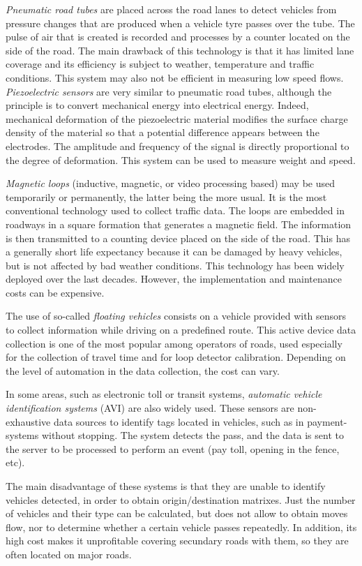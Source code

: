 \documentclass{llncs}
\begin{document}
\emph{Pneumatic road tubes} are placed across the road lanes to detect vehicles from pressure changes that are produced when a vehicle tyre passes over the tube. The pulse of air that is created is recorded and processes by a counter located on the side of the road. The main drawback of this technology is that it has limited lane coverage and its efficiency is subject to weather, temperature and traffic conditions. This system may also not be efficient in measuring low speed flows.
\emph{Piezoelectric sensors} are very similar to pneumatic road tubes, although the principle is to convert mechanical energy into electrical energy. Indeed, mechanical deformation of the piezoelectric material modifies the surface charge density of the material so that a potential difference appears between the electrodes. The amplitude and frequency of the signal is directly proportional to the degree of deformation. This system can be used to measure weight and speed.

\emph{Magnetic loops} (inductive, magnetic, or video processing based) may be used temporarily or permanently, the latter being the more usual. 
It is the most conventional technology used to collect traffic data. The loops are embedded in roadways in a square formation that generates a magnetic field. The information is then transmitted to a counting device placed on the side of the road. This has a generally short life expectancy because it can be damaged by heavy vehicles, but is not affected by bad weather conditions. This technology has been widely deployed over the last decades. However, the implementation and maintenance costs can be expensive.

The use of so-called \emph{floating vehicles} consists on a vehicle provided with sensors to collect information while driving on a predefined route.
This active device data collection is one of the most popular among operators of roads, used especially for the collection of travel time and for loop detector calibration.
Depending on the level of automation in the data collection, the cost can vary.

In some areas, such as electronic toll or transit systems, \emph{automatic vehicle identification systems} (AVI) are also widely used. 
These sensors are non-exhaustive data sources to identify tags located in vehicles, such as in payment-systems without stopping. 
The system detects the pass, and the data is sent to the server to be processed to perform an event (pay toll, opening in the fence, etc).

The main disadvantage of these systems is that they are unable to identify vehicles detected, in order to obtain origin/destination matrixes.
Just the number of vehicles and their type can be calculated, but does not allow to obtain moves flow, nor to determine whether a certain vehicle passes repeatedly.
In addition, its high cost makes it unprofitable covering secundary roads with them, so they are often located on major roads.
\end{document}
